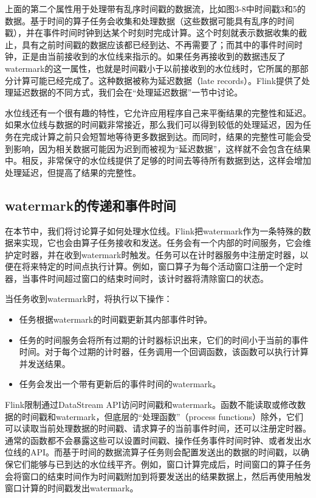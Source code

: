 \documentclass[cn,11pt,chinese]{elegantbook}
\providecommand{\tightlist}{%
  \setlength{\itemsep}{0pt}\setlength{\parskip}{0pt}}
\renewenvironment{quote}{\begin{customblockquote}\list{}{\rightmargin=0em\leftmargin=0em}%
\item\relax\color{blockquote-text}\ignorespaces}{\unskip\unskip\endlist\end{customblockquote}}
\begin{document}
上面的第二个属性用于处理带有乱序时间戳的数据流，比如图3-8中时间戳3和5的数据。基于时间的算子任务会收集和处理数据（这些数据可能具有乱序的时间戳），并在事件时间时钟到达某个时刻时完成计算。这个时刻就表示数据收集的截止，具有之前时间戳的数据应该都已经到达、不再需要了；而其中的事件时间时钟，正是由当前接收到的水位线来指示的。如果任务再接收到的数据违反了watermark的这一属性，也就是时间戳小于以前接收到的水位线时，它所属的那部分计算可能已经完成了。这种数据被称为延迟数据（late
records）。Flink提供了处理延迟数据的不同方式，我们会在``处理延迟数据''一节中讨论。

水位线还有一个很有趣的特性，它允许应用程序自己来平衡结果的完整性和延迟。如果水位线与数据的时间戳非常接近，那么我们可以得到较低的处理延迟，因为任务在完成计算之前只会短暂地等待更多数据到达。而同时，结果的完整性可能会受到影响，因为相关数据可能因为迟到而被视为``延迟数据''，这样就不会包含在结果中。相反，非常保守的水位线提供了足够的时间去等待所有数据到达，这样会增加处理延迟，但提高了结果的完整性。

\hypertarget{watermarkux7684ux4f20ux9012ux548cux4e8bux4ef6ux65f6ux95f4}{%
\subsection{watermark的传递和事件时间}\label{watermarkux7684ux4f20ux9012ux548cux4e8bux4ef6ux65f6ux95f4}}

在本节中，我们将讨论算子如何处理水位线。Flink把watermark作为一条特殊的数据来实现，它也会由算子任务接收和发送。任务会有一个内部的时间服务，它会维护定时器，并在收到watermark时触发。任务可以在计时器服务中注册定时器，以便在将来特定的时间点执行计算。例如，窗口算子为每个活动窗口注册一个定时器，当事件时间超过窗口的结束时间时，该计时器将清除窗口的状态。

当任务收到watermark时，将执行以下操作：

\begin{itemize}
\tightlist
\item
  任务根据watermark的时间戳更新其内部事件时钟。
\item
  任务的时间服务会将所有过期的计时器标识出来，它们的时间小于当前的事件时间。对于每个过期的计时器，任务调用一个回调函数，该函数可以执行计算并发送结果。
\item
  任务会发出一个带有更新后的事件时间的watermark。
\end{itemize}

\begin{quote}
Flink限制通过DataStream
API访问时间戳和watermark。函数不能读取或修改数据的时间戳和watermark，但底层的``处理函数''（process
functions）除外，它们可以读取当前处理数据的时间戳、请求算子的当前事件时间，还可以注册定时器。通常的函数都不会暴露这些可以设置时间戳、操作任务事件时间时钟、或者发出水位线的API。而基于时间的数据流算子任务则会配置发送出的数据的时间戳，以确保它们能够与已到达的水位线平齐。例如，窗口计算完成后，时间窗口的算子任务会将窗口的结束时间作为时间戳附加到将要发送出的结果数据上，然后再使用触发窗口计算的时间戳发出watermark。
\end{quote}
\end{document}
